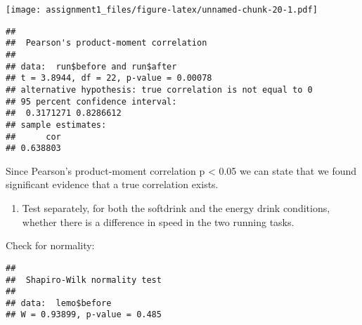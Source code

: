 \documentclass[
]{article}
\newenvironment{Shaded}{\begin{snugshade}}{\end{snugshade}}
\newcommand{\AttributeTok}[1]{\textcolor[rgb]{0.77,0.63,0.00}{#1}}
\newcommand{\CommentTok}[1]{\textcolor[rgb]{0.56,0.35,0.01}{\textit{#1}}}
\newcommand{\FunctionTok}[1]{\textcolor[rgb]{0.00,0.00,0.00}{#1}}
\newcommand{\NormalTok}[1]{#1}
\newcommand{\SpecialCharTok}[1]{\textcolor[rgb]{0.00,0.00,0.00}{#1}}
\newcommand{\StringTok}[1]{\textcolor[rgb]{0.31,0.60,0.02}{#1}}
\providecommand{\tightlist}{%
  \setlength{\itemsep}{0pt}\setlength{\parskip}{0pt}}
\begin{document}
\texttt{[image: assignment1\_files/figure-latex/unnamed-chunk-20-1.pdf]}

\begin{Shaded}
\end{Shaded}

\begin{verbatim}
## 
##  Pearson's product-moment correlation
## 
## data:  run$before and run$after
## t = 3.8944, df = 22, p-value = 0.00078
## alternative hypothesis: true correlation is not equal to 0
## 95 percent confidence interval:
##  0.3171271 0.8286612
## sample estimates:
##      cor 
## 0.638803
\end{verbatim}

Since Pearson's product-moment correlation p \textless{} 0.05 we can
state that we found significant evidence that a true correlation exists.

\begin{enumerate}
\def\labelenumi{\alph{enumi})}
\setcounter{enumi}{1}
\tightlist
\item
  Test separately, for both the softdrink and the energy drink
  conditions, whether there is a difference in speed in the two running
  tasks.
\end{enumerate}

Check for normality:

\begin{Shaded}
\end{Shaded}

\begin{verbatim}
## 
##  Shapiro-Wilk normality test
## 
## data:  lemo$before
## W = 0.93899, p-value = 0.485
\end{verbatim}

\begin{Shaded}
\end{Shaded}
\end{document}
